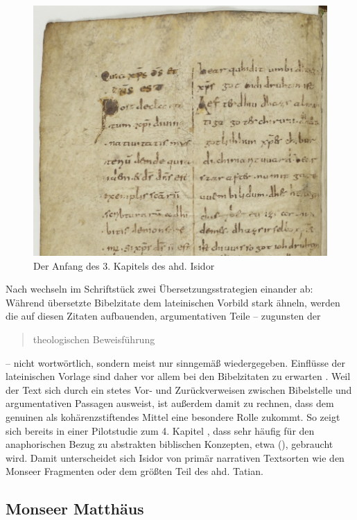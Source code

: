 \begin{figure}[h]
\begin{center}
  \includegraphics[width=10 cm]{images/isidor-kap-3-ausschnitt.jpg}
  \caption {Der Anfang des 3. Kapitels des ahd. Isidor}
\label{abb:isidor4}
\end{center}
\end{figure} 


Nach \textcite{Matzel1970} wechseln im Schriftstück zwei Übersetzungsstrategien einander ab: Während übersetzte Bibelzitate dem lateinischen Vorbild stark ähneln, werden die auf diesen Zitaten aufbauenden, argumentativen Teile -- zugunsten der \blockcquote[357]{Matzel1970}{theologischen Beweisführung} -- nicht wortwörtlich, sondern meist nur sinngemäß wiedergegeben. Einflüsse der lateinischen Vorlage sind daher vor allem bei den Bibelzitaten zu erwarten \parencites()()[33]{Fleischer2006}[45--46]{Schlachter2012}. Weil der Text sich durch ein stetes Vor- und Zurückverweisen zwischen Bibelstelle und argumentativen Passagen ausweist, ist außerdem damit zu rechnen, dass dem genuinen   als kohärenzstiftendes Mittel eine besondere Rolle zukommt. So zeigt sich bereits in einer Pilotstudie zum 4. Kapitel \parencite[s.][]{Szczepaniak2015}, dass  sehr häufig für den anaphorischen  Bezug zu abstrakten   biblischen Konzepten, etwa  (), gebraucht wird. Damit unterscheidet sich Isidor von primär narrativen Textsorten wie den Monseer Fragmenten oder dem größten Teil des ahd. Tatian.   


\subsection{Monseer Matthäus} \label{sec:monsee}


